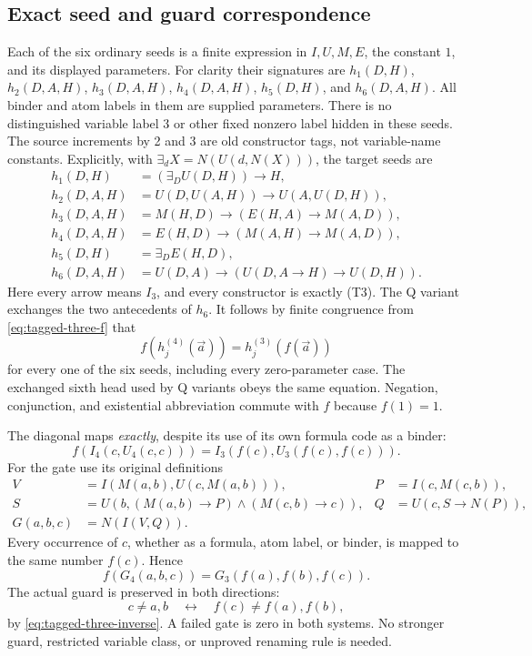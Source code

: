 \subsection{Exact seed and guard correspondence}

Each of the six ordinary seeds is a finite expression in $I,U,M,E$, the
constant $1$, and its displayed parameters.  For clarity their signatures
are $h_1(D,H)$, $h_2(D,A,H)$, $h_3(D,A,H)$, $h_4(D,A,H)$,
$h_5(D,H)$, and $h_6(D,A,H)$.  All binder and atom labels in them are
supplied parameters.  There is no distinguished variable label $3$ or
other fixed nonzero label hidden in these seeds.  The source increments
by 2 and 3 are old constructor tags, not variable-name constants.
Explicitly, with $\exists_d X=N(U(d,N(X)))$, the target seeds are
\[
\begin{aligned}
h_1(D,H)&=(\exists_D U(D,H))\to H,\\
h_2(D,A,H)&=U(D,U(A,H))\to U(A,U(D,H)),\\
h_3(D,A,H)&=M(H,D)\to(E(H,A)\to M(A,D)),\\
h_4(D,A,H)&=E(H,D)\to(M(A,H)\to M(A,D)),\\
h_5(D,H)&=\exists_D E(H,D),\\
h_6(D,A,H)&=U(D,A)\to(U(D,A\to H)\to U(D,H)).
\end{aligned}
\]
Here every arrow means $I_3$, and every constructor is exactly (T3).
The Q variant exchanges the two antecedents of $h_6$.
It follows by finite congruence from \eqref{eq:tagged-three-f} that
\[
 f(h_j^{(4)}(\vec a))=h_j^{(3)}(f(\vec a))
\]
for every one of the six seeds, including every zero-parameter case.
The exchanged sixth head used by Q variants obeys the same equation.
Negation, conjunction, and existential abbreviation commute with $f$
because $f(1)=1$.

The diagonal maps \emph{exactly}, despite its use of its own formula code
as a binder:
\[
 f(I_4(c,U_4(c,c)))=I_3(f(c),U_3(f(c),f(c))).
\]
For the gate use its original definitions
\[
\begin{aligned}
 V&=I(M(a,b),U(c,M(a,b))), &P&=I(c,M(c,b)),\\
 S&=U(b,(M(a,b)\to P)\wedge(M(c,b)\to c)),&
 Q&=U(c,S\to N(P)),\\
 G(a,b,c)&=N(I(V,Q)).
\end{aligned}
\]
Every occurrence of $c$, whether as a formula, atom label, or binder, is
mapped to the same number $f(c)$.  Hence
\[
 f(G_4(a,b,c))=G_3(f(a),f(b),f(c)).
\]
The actual guard is preserved in both directions:
\[
 c\ne a,b\quad\longleftrightarrow\quad f(c)\ne f(a),f(b),
\]
by \eqref{eq:tagged-three-inverse}.  A failed gate is zero in both
systems.  No stronger guard, restricted variable class, or unproved
renaming rule is needed.

